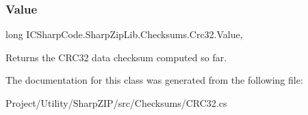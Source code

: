 \subsubsection{\texorpdfstring{Value}{Value}}
{\footnotesize\ttfamily long I\+C\+Sharp\+Code.\+Sharp\+Zip\+Lib.\+Checksums.\+Crc32.\+Value\hspace{0.3cm}{\ttfamily [get]}, {\ttfamily [set]}}



Returns the C\+R\+C32 data checksum computed so far. 



The documentation for this class was generated from the following file\+:\begin{DoxyCompactItemize}
\item 
Project/\+Utility/\+Sharp\+Z\+I\+P/src/\+Checksums/C\+R\+C32.\+cs\end{DoxyCompactItemize}
